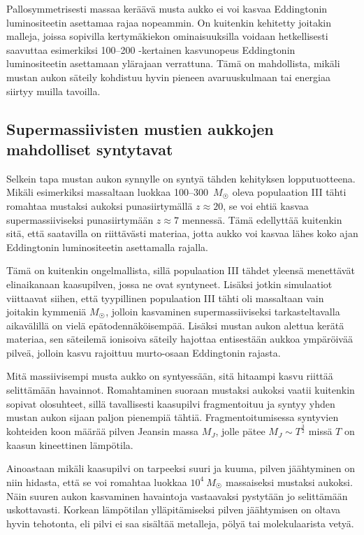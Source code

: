 \documentclass[12pt,a4paper]{article}
\begin{document}
Pallosymmetrisesti massaa keräävä musta aukko ei voi kasvaa Eddingtonin luminositeetin asettamaa rajaa nopeammin. On kuitenkin kehitetty joitakin malleja, joissa sopivilla kertymäkiekon ominaisuuksilla voidaan hetkellisesti saavuttaa esimerkiksi 100--200 -kertainen kasvunopeus Eddingtonin luminositeetin asettamaan ylärajaan verrattuna. Tämä on mahdollista, mikäli mustan aukon säteily kohdistuu hyvin pieneen avaruuskulmaan tai energiaa siirtyy muilla tavoilla. \cite{sadowski}

\subsection[Mustien aukkojen synty]{Supermassiivisten mustien aukkojen mahdolliset syntytavat}
Selkein tapa mustan aukon synnylle on syntyä tähden kehityksen lopputuotteena. Mikäli esimerkiksi massaltaan luokkaa 100--300~$M_{\astrosun}$ oleva populaation III tähti romahtaa mustaksi aukoksi punasiirtymällä $z \approx 20$, se voi ehtiä kasvaa supermassiiviseksi punasiirtymään $z\approx 7$ mennessä. Tämä edellyttää kuitenkin sitä, että saatavilla on riittävästi materiaa, jotta aukko voi kasvaa lähes koko ajan Eddingtonin luminositeetin asettamalla rajalla. \cite{whalen, volker}

Tämä on kuitenkin ongelmallista, sillä populaation III tähdet yleensä menettävät elinaikanaan kaasupilven, jossa ne ovat syntyneet. Lisäksi jotkin simulaatiot viittaavat siihen, että tyypillinen populaation III tähti oli massaltaan vain joitakin kymmeniä $M_{\astrosun}$, jolloin kasvaminen supermassiiviseksi tarkasteltavalla aikavälillä on vielä epätodennäköisempää. Lisäksi mustan aukon alettua kerätä materiaa, sen säteilemä ionisoiva säteily hajottaa entisestään aukkoa ympäröivää pilveä, jolloin kasvu rajoittuu murto-osaan Eddingtonin rajasta. \cite{whalen, alvarez, volker}

Mitä massiivisempi musta aukko on syntyessään, sitä hitaampi kasvu riittää selittämään havainnot. Romahtaminen suoraan mustaksi aukoksi vaatii kuitenkin sopivat olosuhteet, sillä tavallisesti kaasupilvi fragmentoituu ja syntyy yhden mustan aukon sijaan paljon pienempiä tähtiä. Fragmentoitumisessa syntyvien kohteiden koon määrää pilven Jeansin massa $M_J$, jolle pätee $M_J \sim T^{\frac{3}{2}}$ missä $T$ on kaasun kineettinen lämpötila. \cite{volker, rj, tape}

Ainoastaan mikäli kaasupilvi on tarpeeksi suuri ja kuuma, pilven jäähtyminen on niin hidasta, että se voi romahtaa luokkaa $10^4\ M_{\astrosun}$ massaiseksi mustaksi aukoksi. Näin suuren aukon kasvaminen havaintoja vastaavaksi pystytään jo selittämään uskottavasti. Korkean lämpötilan ylläpitämiseksi pilven jäähtymisen on oltava hyvin tehotonta, eli pilvi ei saa sisältää metalleja, pölyä tai molekulaarista vetyä. \cite{volker, rj}
\end{document}
